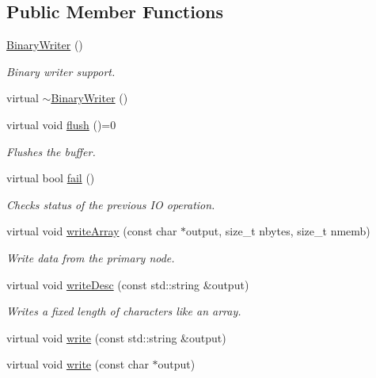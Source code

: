 \subsection*{Public Member Functions}
\begin{DoxyCompactItemize}
\item 
\mbox{\hyperlink{classADATIO_1_1BinaryWriter_ab3eb202f6fb06059cf4dd2eba12280cf}{Binary\+Writer}} ()
\begin{DoxyCompactList}\small\item\em Binary writer support. \end{DoxyCompactList}\item 
virtual \mbox{\hyperlink{classADATIO_1_1BinaryWriter_aa4dca0f30a7074695f62209660131fbf}{$\sim$\+Binary\+Writer}} ()
\item 
virtual void \mbox{\hyperlink{classADATIO_1_1BinaryWriter_a1d335eeed64094b8641f3ebf731c981e}{flush}} ()=0
\begin{DoxyCompactList}\small\item\em Flushes the buffer. \end{DoxyCompactList}\item 
virtual bool \mbox{\hyperlink{classADATIO_1_1BinaryWriter_a68812ccfcedfce8b5459b1327e9b03cb}{fail}} ()
\begin{DoxyCompactList}\small\item\em Checks status of the previous IO operation. \end{DoxyCompactList}\item 
virtual void \mbox{\hyperlink{classADATIO_1_1BinaryWriter_a044495ba6e330922b428658b6a8176fc}{write\+Array}} (const char $\ast$output, size\+\_\+t nbytes, size\+\_\+t nmemb)
\begin{DoxyCompactList}\small\item\em Write data from the primary node. \end{DoxyCompactList}\item 
virtual void \mbox{\hyperlink{classADATIO_1_1BinaryWriter_a616c82aa0768386f730781d4e8552328}{write\+Desc}} (const std\+::string \&output)
\begin{DoxyCompactList}\small\item\em Writes a fixed length of characters like an array. \end{DoxyCompactList}\item 
virtual void \mbox{\hyperlink{classADATIO_1_1BinaryWriter_ac7731874e4949f80f0edbad2474c4b64}{write}} (const std\+::string \&output)
\item 
virtual void \mbox{\hyperlink{classADATIO_1_1BinaryWriter_a124ca67335cb24b5da69258dcd330b50}{write}} (const char $\ast$output)

\end{DoxyCompactItemize}
